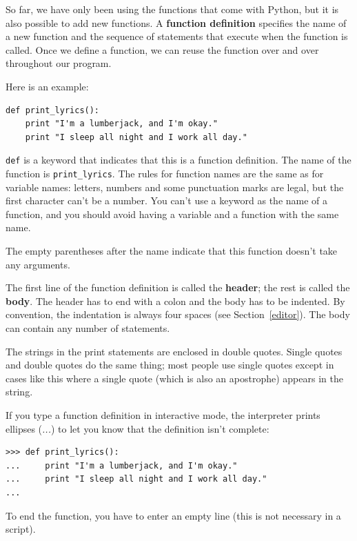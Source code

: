 \documentclass[10pt]{book}
\begin{document}
So far, we have only been using the functions that come with Python,
but it is also possible to add new functions.
A {\bf function definition} specifies the name of a new function and
the sequence of statements that execute when the function is called.
Once we define a function, we can reuse the function over and over 
throughout our program.


Here is an example:

\beforeverb
\begin{verbatim}
def print_lyrics():
    print "I'm a lumberjack, and I'm okay."
    print "I sleep all night and I work all day."
\end{verbatim}
\afterverb
%
{\tt def} is a keyword that indicates that this is a function
definition.  The name of the function is \verb"print_lyrics".  The
rules for function names are the same as for variable names: letters,
numbers and some punctuation marks are legal, but the first character
can't be a number.  You can't use a keyword as the name of a function,
and you should avoid having a variable and a function with the same
name.


The empty parentheses after the name indicate that this function
doesn't take any arguments.


The first line of the function definition is called the {\bf header};
the rest is called the {\bf body}.  The header has to end with a colon
and the body has to be indented.  By convention, the indentation is
always four spaces (see Section~\ref{editor}).  The body can contain
any number of statements.

The strings in the print statements are enclosed in double
quotes.  Single quotes and double quotes do the same thing;
most people use single quotes except in cases like this where
a single quote (which is also an apostrophe) appears in the string.


If you type a function definition in interactive mode, the interpreter
prints ellipses ({\em ...}) to let you know that the definition
isn't complete:

\beforeverb
\begin{verbatim}
>>> def print_lyrics():
...     print "I'm a lumberjack, and I'm okay."
...     print "I sleep all night and I work all day."
...
\end{verbatim}
\afterverb
%
To end the function, you have to enter an empty line (this is
not necessary in a script).
\end{document}
